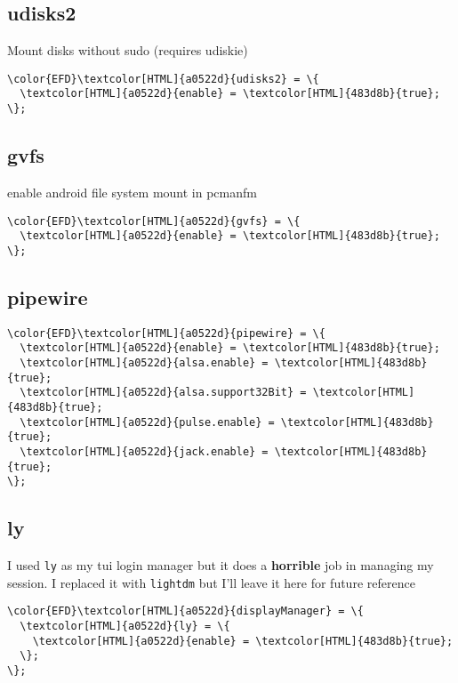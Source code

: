 \documentclass[14pt]{article}
\begin{document}
\subsection{udisks2}
\label{sec:org758fda5}
Mount disks without sudo (requires udiskie)
\begin{Code}
\begin{Verbatim}
\color{EFD}\textcolor[HTML]{a0522d}{udisks2} = \{
  \textcolor[HTML]{a0522d}{enable} = \textcolor[HTML]{483d8b}{true};
\};
\end{Verbatim}
\end{Code}
\subsection{gvfs}
\label{sec:org1178409}
enable android file system mount in pcmanfm
\begin{Code}
\begin{Verbatim}
\color{EFD}\textcolor[HTML]{a0522d}{gvfs} = \{
  \textcolor[HTML]{a0522d}{enable} = \textcolor[HTML]{483d8b}{true};
\};
\end{Verbatim}
\end{Code}
\subsection{pipewire}
\label{sec:orgf634264}
\begin{Code}
\begin{Verbatim}
\color{EFD}\textcolor[HTML]{a0522d}{pipewire} = \{
  \textcolor[HTML]{a0522d}{enable} = \textcolor[HTML]{483d8b}{true};
  \textcolor[HTML]{a0522d}{alsa.enable} = \textcolor[HTML]{483d8b}{true};
  \textcolor[HTML]{a0522d}{alsa.support32Bit} = \textcolor[HTML]{483d8b}{true};
  \textcolor[HTML]{a0522d}{pulse.enable} = \textcolor[HTML]{483d8b}{true};
  \textcolor[HTML]{a0522d}{jack.enable} = \textcolor[HTML]{483d8b}{true};
\};
\end{Verbatim}
\end{Code}
\subsection{ly}
\label{sec:org3cb56de}
I used \texttt{ly} as my tui login manager but it does a \textbf{horrible} job in managing my session. I replaced it with \texttt{lightdm} but I'll leave it here for future reference
\begin{Code}
\begin{Verbatim}
\color{EFD}\textcolor[HTML]{a0522d}{displayManager} = \{
  \textcolor[HTML]{a0522d}{ly} = \{
    \textcolor[HTML]{a0522d}{enable} = \textcolor[HTML]{483d8b}{true};
  \};
\};
\end{Verbatim}
\end{Code}
\end{document}
